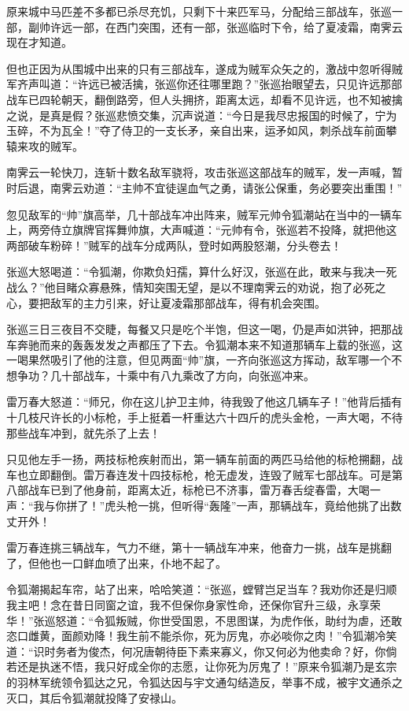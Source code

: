 \documentclass[12pt,oneside]{book}
\begin{document}
原来城中马匹差不多都已杀尽充饥，只剩下十来匹军马，分配给三部战车，张巡一部，副帅许远一部，在西门突围，还有一部，张巡临时下令，给了夏凌霜，南霁云现在才知道。

但也正因为从围城中出来的只有三部战车，遂成为贼军众矢之的，激战中忽听得贼军齐声叫道：``许远已被活擒，张巡你还往哪里跑？''张巡抬眼望去，只见许远那部战车已四轮朝天，翻倒路旁，但人头拥挤，距离太远，却看不见许远，也不知被擒之说，是真是假？张巡悲愤交集，沉声说道：``今日是我尽忠报国的时候了，宁为玉碎，不为瓦全！''夺了侍卫的一支长矛，亲自出来，运矛如风，刺杀战车前面攀辕来攻的贼军。

南霁云一轮快刀，连斩十数名敌军骁将，攻击张巡这部战车的贼军，发一声喊，暂时后退，南霁云劝道：``主帅不宜徒逞血气之勇，请张公保重，务必要突出重围！''

忽见敌军的``帅''旗高举，几十部战车冲出阵来，贼军元帅令狐潮站在当中的一辆车上，两旁侍立旗牌官挥舞帅旗，大声喊道：``元帅有令，张巡若不投降，就把他这两部破车粉碎！''贼军的战车分成两队，登时如两股怒潮，分头卷去！

张巡大怒喝道：``令狐潮，你欺负妇孺，算什么好汉，张巡在此，敢来与我决一死战么？''他目睹众寡悬殊，情知突围无望，是以不理南霁云的劝说，抱了必死之心，要把敌军的主力引来，好让夏凌霜那部战车，得有机会突围。

张巡三日三夜目不交睫，每餐又只是吃个半饱，但这一喝，仍是声如洪钟，把那战车奔驰而来的轰轰发发之声都压了下去。令狐潮本来不知道那辆车上载的张巡，这一喝果然吸引了他的注意，但见两面``帅''旗，一齐向张巡这方挥动，敌军哪一个不想争功？几十部战车，十乘中有八九乘改了方向，向张巡冲来。

雷万春大怒道：``师兄，你在这儿护卫主帅，待我毁了他这几辆车子！''他背后插有十几枝尺许长的小标枪，手上挺着一杆重达六十四斤的虎头金枪，一声大喝，不待那些战车冲到，就先杀了上去！

只见他左手一扬，两技标枪疾射而出，第一辆车前面的两匹马给他的标枪搠翻，战车也立即翻倒。雷万春连发十四技标枪，枪无虚发，连毁了贼军七部战车。可是第八部战车已到了他身前，距离太近，标枪已不济事，雷万春舌绽春雷，大喝一声：``我与你拼了！''虎头枪一挑，但听得``轰隆''一声，那辆战车，竟给他挑了出数丈开外！

雷万春连挑三辆战车，气力不继，第十一辆战车冲来，他奋力一挑，战车是挑翻了，但他也一口鲜血喷了出来，仆地不起了。

令狐潮揭起车帘，站了出来，哈哈笑道：``张巡，螳臂岂足当车？我劝你还是归顺我主吧！念在昔日同窗之谊，我不但保你身家性命，还保你官升三级，永享荣华！''张巡怒道：``令狐叛贼，你世受国恩，不思图谋，为虎作伥，助纣为虐，还敢恣口雌黄，面颜劝降！我生前不能杀你，死为厉鬼，亦必啖你之肉！''令狐潮冷笑道：``识时务者为俊杰，何况唐朝待臣下素来寡义，你又何必为他卖命？好，你倘若还是执迷不悟，我只好成全你的志愿，让你死为厉鬼了！''原来令狐潮乃是玄宗的羽林军统领令狐达之兄，令狐达因与宇文通勾结造反，举事不成，被宇文通杀之灭口，其后令狐潮就投降了安禄山。
\end{document}
